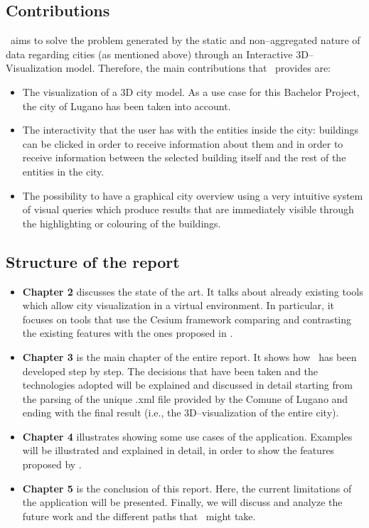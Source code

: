 \subsection{Contributions}
\applicationName\ aims to solve the problem generated by the static and non--aggregated nature of data regarding cities (as mentioned above) through an Interactive 3D--Visualization model. Therefore, the main contributions that \applicationName\ provides are:
\begin{itemize}
	\item The visualization of a 3D city model. As a use case for this Bachelor Project, the city of Lugano has been taken into account.
	\item The interactivity that the user has with the entities inside the city: buildings can be clicked in order to receive information about them and in order to receive information between the selected building itself and the rest of the entities in the city.
	\item The possibility to have a graphical city overview using a very intuitive system of visual queries which produce results that are immediately visible through the highlighting or colouring of the buildings. 
\end{itemize} 
\subsection{Structure of the report}
\begin{itemize}
	\item {\bf Chapter 2} discusses the state of the art. It talks about already existing tools which allow city visualization in a virtual environment. In particular, it focuses on tools that use the Cesium framework comparing and contrasting the existing features with the ones proposed in \applicationName.
	\item {\bf Chapter 3} is the main chapter of the entire report. It shows how \applicationName\ has been developed step by step. The decisions that have been taken and the technologies adopted will be explained and discussed in detail starting from the parsing of the unique .xml file provided by the Comune of Lugano and ending with the final result (i.e., the 3D--visualization of the entire city). 
	\item {\bf Chapter 4} illustrates showing some use cases of the application. Examples will be illustrated and explained in detail, in order to show the features proposed by \applicationName. 
	\item {\bf Chapter 5} is the conclusion of this report. Here, the current limitations of the application will be presented. Finally, we will discuss and analyze the future work and the different paths that \applicationName\ might take.
\end{itemize}